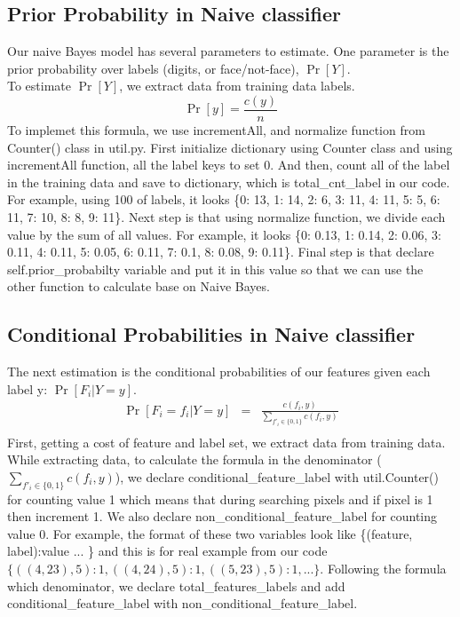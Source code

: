 \documentclass{article}
\begin{document}
    \subsection{Prior Probability in Naive classifier}
        Our naive Bayes model has several parameters to estimate. One parameter is the prior probability over labels (digits, or face/not-face), $\Pr[Y]$.\\
        To estimate $\Pr[Y]$, we extract data from training data labels. 
        \begin{displaymath}
        \Pr[y] = \frac{c(y)}{n}
        \end{displaymath}
        To implemet this formula, we use incrementAll, and normalize function from Counter() class in util.py. First initialize dictionary using Counter class and using incrementAll function, all the label keys to set 0. And then, count all of the label in the training data and save to dictionary, which is total\_cnt\_label in our code. For example, using 100 of labels, it looks \{0: 13, 1: 14, 2: 6, 3: 11, 4: 11, 5: 5, 6: 11, 7: 10, 8: 8, 9: 11\}. Next step is that using normalize function, we divide each value by the sum of all values. For example, it looks \{0: 0.13, 1: 0.14, 2: 0.06, 3: 0.11, 4: 0.11, 5: 0.05, 6: 0.11, 7: 0.1, 8: 0.08, 9: 0.11\}.
        Final step is that declare self.prior\_probabilty variable and put it in this value so that we can use the other function to calculate base on Naive Bayes. 

    \subsection{Conditional Probabilities in Naive classifier}
        The next estimation is the conditional probabilities of our features given each label y: $\Pr[F_i \vert Y = y]$.
        \begin{eqnarray*}
        \Pr[F_i=f_i\vert Y=y] &=& \frac{c(f_i,y)}{\sum_{f'_i\in \{0,1\}}{c(f_i,y)}} \\
        \end{eqnarray*}
        First, getting a cost of feature and label set, we extract data from training data. While extracting data, to calculate the formula in the denominator (${\sum_{f'_i\in \{0,1\}}{c(f_i,y)}}$), we declare conditional\_feature\_label with util.Counter() for counting value 1 which means that during searching pixels and if pixel is 1 then increment 1. We also declare non\_conditional\_feature\_label for counting value 0. For example, the format of these two variables look like \{(feature, label):value ... \} and this is for real example from our code $\{((4, 23), 5): 1, ((4, 24), 5): 1, ((5, 23), 5): 1,...\}$. Following the formula which denominator, we declare total\_features\_labels and add conditional\_feature\_label with non\_conditional\_feature\_label.
        
\end{document}

